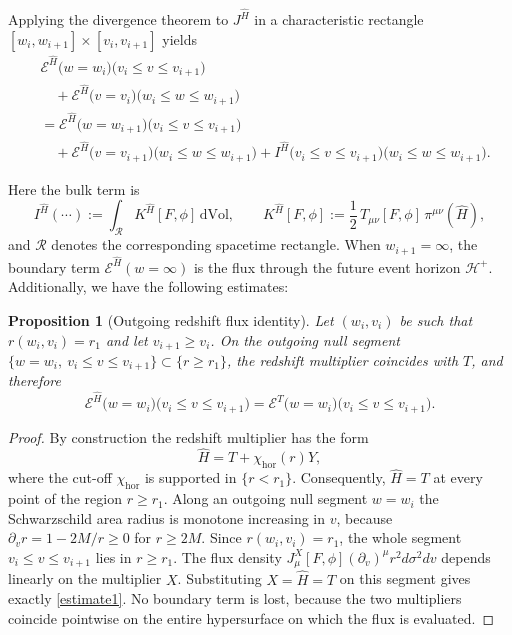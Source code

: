 \documentclass[11pt]{article}
\numberwithin{equation}{section}
\theoremstyle{plain}
\newtheorem{proposition}[theorem]{Proposition}
\theoremstyle{definition}
\theoremstyle{remark}
\begin{document}
Applying the divergence theorem to $J^{\hat H}$ in a characteristic rectangle $[w_i,w_{i+1}]\times[v_i,v_{i+1}]$ yields
\begin{eqnarray}\label{eqIH}
&\mathcal{E}^{\hat H}\bigl(w=w_i\bigr)\bigl(v_i\le v\le v_{i+1}\bigr)
\nonumber\\
&\quad+
\mathcal{E}^{\hat H}\bigl(v=v_i\bigr)\bigl(w_i\le w\le w_{i+1}\bigr)
\nonumber\\
&=
\mathcal{E}^{\hat H}\bigl(w=w_{i+1}\bigr)\bigl(v_i\le v\le v_{i+1}\bigr)
\nonumber\\
&\quad+
\mathcal{E}^{\hat H}\bigl(v=v_{i+1}\bigr)\bigl(w_i\le w\le w_{i+1}\bigr)
+
I^{\hat H}\bigl(v_i\le v\le v_{i+1}\bigr)\bigl(w_i\le w\le w_{i+1}\bigr).
\end{eqnarray}


Here the bulk term is
\begin{equation}\label{IH}
I^{\hat H}(\cdots) := \int_{\mathcal R} K^{\hat H}[F,\phi]\,\text{dVol},
\qquad
K^{\hat H}[F,\phi] := \frac12\, T_{\mu\nu}[F,\phi]\,\pi^{\mu\nu}(\hat H),
\end{equation}
and $\mathcal R$ denotes the corresponding spacetime rectangle.
When $w_{i+1}=\infty$, the boundary term $\mathcal{E}^{\hat H}(w=\infty)$ is the flux through the future event horizon $\mathcal H^{+}$.
Additionally, we have the following estimates:
\begin{proposition}[Outgoing redshift flux identity]\label{prep4}
Let $(w_i,v_i)$ be such that $r(w_i,v_i)=r_1$ and let $v_{i+1}\ge v_i$.
On the outgoing null segment $\{w=w_i,\ v_i\le v\le v_{i+1}\}\subset\{r\ge r_1\}$, the redshift multiplier coincides with $T$, and therefore
\begin{equation}\label{estimate1}
\mathcal{E}^{\hat H}\bigl(w=w_i\bigr)\bigl(v_i\le v\le v_{i+1}\bigr)
=
\mathcal{E}^{T}\bigl(w=w_i\bigr)\bigl(v_i\le v\le v_{i+1}\bigr).
\end{equation}
\end{proposition}

\begin{proof}
By construction the redshift multiplier has the form
\[
 \hat H=T+\chi_{\mathrm{hor}}(r)Y,
\]
where the cut-off \(\chi_{\mathrm{hor}}\) is supported in \(\{r<r_1\}\).  Consequently, \(\hat H=T\) at every point of the region \(r\ge r_1\).  Along an outgoing null segment \(w=w_i\) the Schwarzschild area radius is monotone increasing in \(v\), because \(\partial_v r=1-2M/r\ge0\) for \(r\ge 2M\).  Since \(r(w_i,v_i)=r_1\), the whole segment \(v_i\le v\le v_{i+1}\) lies in \(r\ge r_1\).  The flux density \(J^{X}_\mu[ F,\phi](\partial_v)^\mu r^2d\sigma^2dv\) depends linearly on the multiplier \(X\).  Substituting \(X=\hat H=T\) on this segment gives exactly \eqref{estimate1}.  No boundary term is lost, because the two multipliers coincide pointwise on the entire hypersurface on which the flux is evaluated.
\end{proof}
\end{document}
